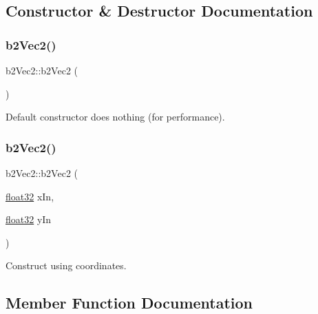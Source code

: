 \subsection{Constructor \& Destructor Documentation}
\mbox{\label{structb2_vec2_a9171b31deb83af96872f99689939a12f}} 
\subsubsection{\texorpdfstring{b2Vec2()}{b2Vec2()}\hspace{0.1cm}{\footnotesize\ttfamily [1/2]}}
{\footnotesize\ttfamily b2\+Vec2\+::b2\+Vec2 (\begin{DoxyParamCaption}{ }\end{DoxyParamCaption})\hspace{0.3cm}{\ttfamily [inline]}}



Default constructor does nothing (for performance). 

\mbox{\label{structb2_vec2_a5d9a42aed33251a53c33a1ff7dd6be43}} 
\subsubsection{\texorpdfstring{b2Vec2()}{b2Vec2()}\hspace{0.1cm}{\footnotesize\ttfamily [2/2]}}
{\footnotesize\ttfamily b2\+Vec2\+::b2\+Vec2 (\begin{DoxyParamCaption}\item[{\mbox{\hyperlink{b2_settings_8h_aacdc525d6f7bddb3ae95d5c311bd06a1}{float32}}}]{x\+In,  }\item[{\mbox{\hyperlink{b2_settings_8h_aacdc525d6f7bddb3ae95d5c311bd06a1}{float32}}}]{y\+In }\end{DoxyParamCaption})\hspace{0.3cm}{\ttfamily [inline]}}



Construct using coordinates. 



\subsection{Member Function Documentation}
\mbox{\label{structb2_vec2_abad59bf9a0269f02cda9dc919592c0ee}} 
